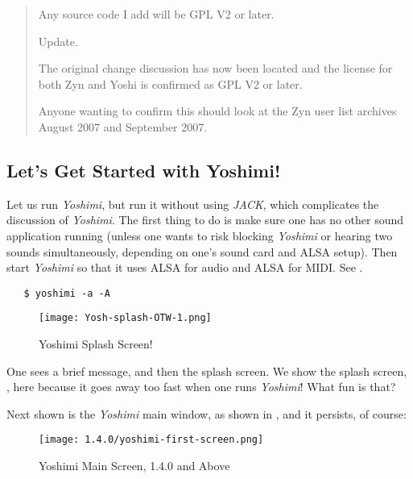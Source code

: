 \documentclass[
 11pt,
 twoside,
 a4paper,
 final                                 %
]{article}
\begin{document}
\begin{quotation}
      Any source code I add will be GPL V2 or later.

      Update.

      The original change discussion has now been located and the license for
      both Zyn and Yoshi is confirmed as GPL V2 or later.

      Anyone wanting to confirm this should look at the Zyn user list archives
      August 2007 and September 2007.
   \end{quotation}

\subsection{Let's Get Started with Yoshimi!}
\label{subsec:introduction_lets_get_started}

   Let us run \textsl{Yoshimi}, but run it without using \textsl{JACK}, which
   complicates the discussion of \textsl{Yoshimi}.  The first
   thing to do is make sure one has no other sound application running
   (unless one wants to risk blocking \textsl{Yoshimi} or hearing two sounds
   simultaneously, depending on one's sound card and ALSA setup).
   Then start \textsl{Yoshimi} so that it uses ALSA for audio and ALSA for
   MIDI.  See .

\begin{verbatim}
   $ yoshimi -a -A
\end{verbatim}

\begin{figure}[H]
   \centering 
   \texttt{[image: Yosh-splash-OTW-1.png]}
   \caption{Yoshimi Splash Screen!}
   \label{fig:yoshimi_splash_screen}
\end{figure}

   One sees a brief message, and then the splash screen.
   We show the splash screen, ,
   here because it goes away too fast when one runs \textsl{Yoshimi}!
   What fun is that?

   Next shown is the \textsl{Yoshimi} main window,
   as shown in ,
   and it persists, of course:

\begin{figure}[H]
   \centering 
   \texttt{[image: 1.4.0/yoshimi-first-screen.png]}
   \caption{Yoshimi Main Screen, 1.4.0 and Above}
   \label{fig:yoshimi_main_screen}
\end{figure}
\end{document}
